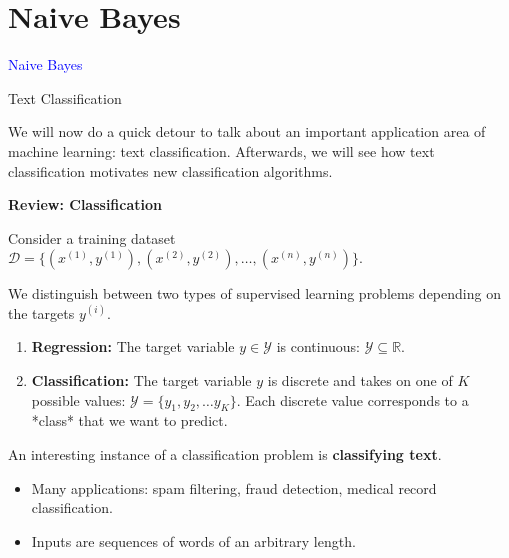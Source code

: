 \documentclass[../../main.tex]{subfiles}
\begin{document}
\graphicspath{{figures/}{lectures/06_naive_bayes/figures/}}
\section{Naive Bayes}
\begin{frame}[plain]
  \vfill\begin{center}{\Huge \textcolor{blue}{Naive Bayes}}\end{center}\vfill
\end{frame}
\begin{frame}[fragile]{Text Classification}

We will now do a quick detour to talk about an important application area of machine learning: text classification. Afterwards, we will see how text classification motivates new classification algorithms.


\vspace{0.2cm}

\textbf{Review: Classification}

Consider a training dataset $\mathcal{D} = \{(x^{(1)}, y^{(1)}), (x^{(2)}, y^{(2)}), \ldots, (x^{(n)}, y^{(n)})\}$.

We distinguish between two types of supervised learning problems depending on the targets $y^{(i)}$. 

\begin{enumerate}
    \item \textbf{Regression:} The target variable $y \in \mathcal{Y}$ is continuous:  $\mathcal{Y} \subseteq \mathbb{R}$.
    \item \textbf{Classification:} The target variable $y$ is discrete and takes on one of $K$ possible values:  $\mathcal{Y} = \{y_1, y_2, \ldots y_K\}$. Each discrete value corresponds to a *class* that we want to predict.
\end{enumerate}

An interesting instance of a classification problem is \textbf{classifying text}.
\begin{itemize}
    \item Many applications: spam filtering, fraud detection, medical record classification.
    \item Inputs are sequences of words of an arbitrary length.
\end{itemize}
\end{frame}
\end{document}
